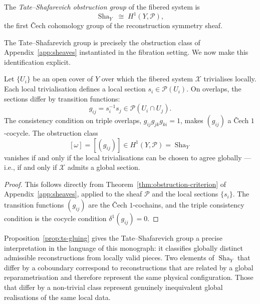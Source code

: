 \documentclass[11pt,openany]{book}
\newcommand{\Sha}{\operatorname{Sha}}
\begin{document}
\begin{definition}
\label{def:tate-shafarevich}
The \emph{Tate--Shafarevich obstruction group} of the
fibered system is
\[
  \Sha_Y \;\cong\; H^1(Y, \mathcal{P}),
\]
the first \v{C}ech cohomology group of the reconstruction
symmetry sheaf.
\end{definition}

The Tate--Shafarevich group is precisely the obstruction
class of Appendix~\ref{app:sheaves} instantiated in the
fibration setting.  We now make this identification
explicit.

\begin{proposition}
\label{prop:ts-gluing}
Let $\{U_i\}$ be an open cover of $Y$ over which the
fibered system $\mathcal{X}$ trivialises locally.  Each
local trivialisation defines a local section $s_i \in
\mathcal{P}(U_i)$.  On overlaps, the sections differ by
transition functions:
\[
  g_{ij} = s_i^{-1} s_j \in \mathcal{P}(U_i \cap U_j).
\]
The consistency condition on triple overlaps,
$g_{ij} g_{jk} g_{ki} = 1$, makes $(g_{ij})$ a
\v{C}ech $1$-cocycle.  The obstruction class
\[
  [\omega] = [(g_{ij})] \in H^1(Y, \mathcal{P}) = \Sha_Y
\]
vanishes if and only if the local trivialisations can be
chosen to agree globally --- i.e., if and only if
$\mathcal{X}$ admits a global section.
\end{proposition}

\begin{proof}
This follows directly from Theorem~\ref{thm:obstruction-criterion}
of Appendix~\ref{app:sheaves}, applied to the sheaf
$\mathcal{P}$ and the local sections $\{s_i\}$.  The
transition functions $(g_{ij})$ are the Čech $1$-cochains,
and the triple consistency condition is the cocycle
condition $\delta^1(g_{ij}) = 0$.
\end{proof}

\begin{remark}
Proposition~\ref{prop:ts-gluing} gives the Tate--Shafarevich
group a precise interpretation in the language of this
monograph: it classifies globally distinct admissible
reconstructions from locally valid pieces.  Two elements
of $\Sha_Y$ that differ by a coboundary correspond to
reconstructions that are related by a global
reparametrisation and therefore represent the same
physical configuration.  Those that differ by a non-trivial
class represent genuinely inequivalent global realisations
of the same local data.
\end{remark}
\end{document}
